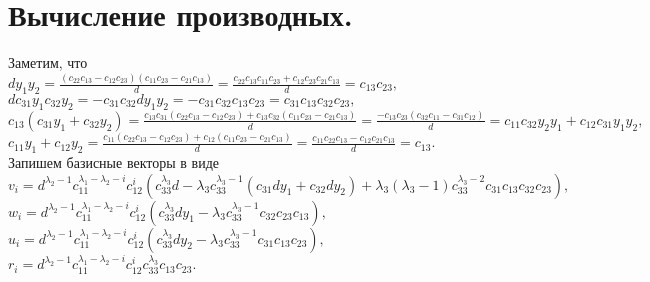 \documentclass[12pt]{article}
\begin{document}
\section*{Вычисление производных.}

Заметим, что
\\
$ d y_1 y_2 = \frac{ (c_{22}c_{13} - c_{12}c_{23}) (c_{11}c_{23} - c_{21}c_{13}) }{d} = \frac{ c_{22}c_{13}c_{11}c_{23} + c_{12}c_{23}c_{21}c_{13} }{d} = c_{13}c_{23}, $
\\
$ d c_{31} y_1 c_{32} y_2 = - c_{31}c_{32} d y_1 y_2 = - c_{31}c_{32}c_{13}c_{23} = c_{31}c_{13}c_{32}c_{23}, $
\\
$ c_{13} (c_{31} y_1 + c_{32} y_2) = \frac{c_{13}c_{31} (c_{22}c_{13} - c_{12}c_{23}) + c_{13}c_{32} (c_{11}c_{23} - c_{21}c_{13}) }{d} = \frac{-c_{13}c_{23} (c_{32}c_{11} - c_{31}c_{12})}{d} = c_{11} c_{32} y_2 y_1 + c_{12}c_{31} y_1 y_2, $
\\
$ c_{11} y_1 + c_{12} y_2 = \frac{c_{11} (c_{22}c_{13} - c_{12}c_{23}) + c_{12} (c_{11}c_{23} - c_{21}c_{13}) }{d} = 
\frac{ c_{11}c_{22}c_{13} - c_{12}c_{21}c_{13} }{d} = c_{13}. $
\\



Запишем базисные векторы в виде
\\
$ v_i = d^{\lambda_2 - 1} c_{11}^{\lambda_1 - \lambda_2 - i} c_{12}^i (c_{33}^{\lambda_3} d - \lambda_3 c_{33}^{\lambda_3 - 1} (c_{31} d y_1 + c_{32} d y_2) + \lambda_3 (\lambda_3 - 1) c_{33}^{\lambda_3 - 2} c_{31}c_{13}c_{32}c_{23}), $
\\
$ w_i = d^{\lambda_2 - 1} c_{11}^{\lambda_1 - \lambda_2 - i} c_{12}^i (c_{33}^{\lambda_3} d y_1 - \lambda_3 c_{33}^{\lambda_3 - 1} c_{32}c_{23}c_{13}), $
\\
$ u_i = d^{\lambda_2 - 1} c_{11}^{\lambda_1 - \lambda_2 - i} c_{12}^i (c_{33}^{\lambda_3} d y_2 - \lambda_3 c_{33}^{\lambda_3 - 1} c_{31}c_{13}c_{23}), $
\\
$ r_i = d^{\lambda_2 - 1} c_{11}^{\lambda_1 - \lambda_2 - i} c_{12}^i c_{33}^{\lambda_3} c_{13}c_{23}. $
\newline


\newline


\newline


\newline


\end{document}

